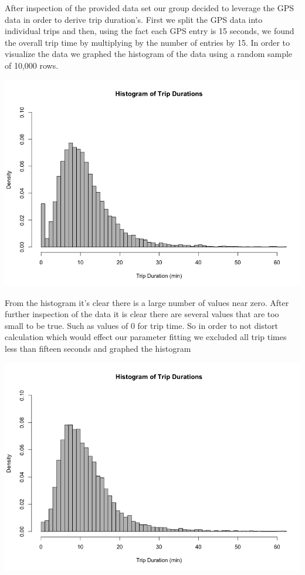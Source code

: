 \documentclass{article}
\numberwithin{equation}{section}
\begin{document}
After inspection of the provided data set our group decided to leverage the GPS data in order to derive trip duration's. First we split the GPS data into individual trips and then, using the fact each GPS entry is 15 seconds, we found the overall trip time by multiplying by the number of entries by 15. In order to visualize the data we graphed the histogram of the data using a random sample of 10,000 rows.

\includegraphics[scale=0.5]{raw_data_histogram_trip.png}

From the histogram it's clear there is a large number of values near zero. After further inspection of the data it is clear there are several values that are too small to be true. Such as values of 0 for trip time. So in order to not distort calculation which would effect our parameter fitting we excluded all trip times less than fifteen seconds and graphed the histogram

\includegraphics[scale=0.5]{clean_data_no_curve.png}
\end{document}
